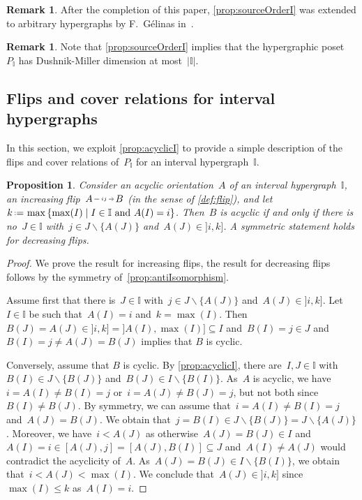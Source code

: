\documentclass{amsart}
\newtheorem{proposition}[theorem]{Proposition}
\theoremstyle{definition}
\newtheorem{remark}[theorem]{Remark}
\newcommand{\set}[2]{\left\{ #1 \;\middle|\; #2 \right\}} %
\newcommand{\ssm}{\smallsetminus} %
\newcommand{\eqdef}{\mbox{\,\raisebox{0.2ex}{\scriptsize\ensuremath{\mathrm:}}\ensuremath{=}\,}} %
\newcommand{\II}{\mathbb I} %
\newcommand{\flip}[4]{\ensuremath{#1 \, \begin{tikzpicture}[scale=1,baseline=-.1cm] \path[->]  (0,0) edge node[fill=white,inner sep=2pt, font=\tiny ] {$#2#3$} (.7,0); \end{tikzpicture} \, #4}}
\begin{document}
\begin{remark}
After the completion of this paper, \cref{prop:sourceOrderI} was extended to arbitrary hypergraphs by F.~Gélinas in~\cite{Gelinas}.
\end{remark}

\begin{remark}
Note that \cref{prop:sourceOrderI} implies that the hypergraphic poset~$P_\II$ has Dushnik-Miller dimension at most~$|\II|$.
\end{remark}


\subsection{Flips and cover relations for interval hypergraphs}  
\label{subsec:cover}

In this section, we exploit \cref{prop:acyclicI} to provide a simple description of the flips and cover relations of~$P_\II$ for an interval hypergraph~$\II$.

\begin{proposition}
\label{prop:isFlipI}
Consider an acyclic orientation~$A$ of an interval hypergraph~$\II$, an increasing flip~$\flip{A}{i}{j}{B}$ (in the sense of \cref{def:flip}), and let~$k \eqdef \max\set{\max(I)}{I \in \II \text{ and } A(I) = i}$.
Then~$B$ is acyclic if and only if there is no~$J \in \II$ with~$j \in J \ssm \{A(J)\}$ and~$A(J) \in {]i,k]}$.
A symmetric statement holds for decreasing flips.
\end{proposition}

\begin{proof}
We prove the result for increasing flips, the result for decreasing flips follows by the symmetry of~\cref{prop:antiIsomorphism}.

\pagebreak
Assume first that there is~$J \in \II$ with~$j \in J \ssm \{A(J)\}$ and~$A(J) \in {]i,k]}$.
Let~$I \in \II$ be such that~$A(I) = i$ and~$k = \max(I)$.
Then~$B(J) = A(J) \in {]i,k]} = {]A(I), \max(I)]} \subseteq I$ and~$B(I) = j \in J$ and~$B(I) = j \ne A(J) = B(J)$ implies that $B$ is cyclic.

Conversely, assume that $B$ is cyclic.
By \cref{prop:acyclicI}, there are~$I,J \in \II$ with~${B(I) \in J \ssm \{B(J)\}}$ and~$B(J) \in I \ssm \{B(I)\}$.
As~$A$ is acyclic, we have~$i = A(I) \ne B(I) = j$ or~$i = A(J) \ne B(J) = j$, but not both since~$B(I) \ne B(J)$.
By symmetry, we can assume that~$i = A(I) \ne B(I) = j$ and~$A(J) = B(J)$.
We obtain that~$j = B(I) \in J \ssm \{B(J)\} = J \ssm \{A(J)\}$.
Moreover, we have~$i < A(J)$ as otherwise~$A(J) = B(J) \in I$ and~$A(I) = i \in [A(J), j] = [A(J), B(I)] \subseteq J$ and~$A(I) \ne A(J)$ would contradict the acyclicity of~$A$.
As~$A(J) = B(J) \in I \ssm \{B(I)\}$, we obtain that~$i < A(J) < \max(I)$.
We conclude that~$A(J) \in {]i,k]}$ since~$\max(I) \le k$ as~$A(I) = i$.
\end{proof}
\end{document}
